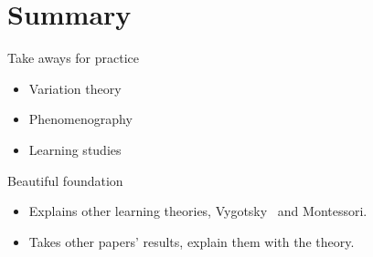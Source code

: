 \section{Summary}

\begin{frame}
  \begin{block}{Take aways for practice}
    \begin{itemize}
      \item Variation theory
      \item Phenomenography
      \item Learning studies
    \end{itemize}
  \end{block}

  \begin{block}{Beautiful foundation}
    \begin{itemize}
      \item Explains other learning theories, \eg Vygotsky~\cite{Vygotsky} and 
        Montessori.
      \item Takes other papers' results, explain them with the theory.
    \end{itemize}
  \end{block}
\end{frame}

